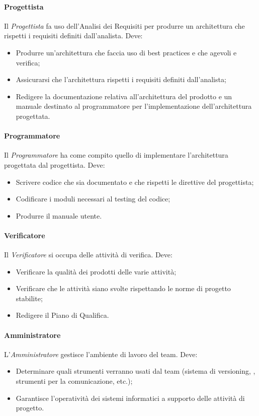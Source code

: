 \paragraph{Progettista} \Spazio
Il \emph{Progettista} fa uso dell'Analisi dei Requisiti per produrre un architettura che rispetti i requisiti definiti dall'analista. Deve:
\begin{itemize}
\item Produrre un'architettura che faccia uso di best practices e che agevoli  e verifica;
\item Assicurarsi che l'architettura rispetti i requisiti definiti dall'analista;
\item Redigere la documentazione relativa all'architettura del prodotto e un manuale destinato al programmatore per l'implementazione dell'architettura progettata.
\end{itemize}

\paragraph{Programmatore} \Spazio
Il \emph{Programmatore} ha come compito quello di implementare l'architettura progettata dal progettista. Deve:
\begin{itemize}
\item Scrivere codice che sia documentato e che rispetti le direttive del progettista;
\item Codificare i moduli necessari al testing del codice;
\item Produrre il manuale utente.
\end{itemize}

\paragraph{Verificatore} \Spazio
Il \emph{Verificatore} si occupa delle attività di verifica. Deve:
\begin{itemize}
\item Verificare la qualità dei prodotti delle varie attività;
\item Verificare che le attività siano svolte rispettando le norme di progetto stabilite;
\item Redigere il Piano di Qualifica.
\end{itemize}

\paragraph{Amministratore} \Spazio
L'\emph{Amministratore} gestisce l'ambiente di lavoro del team. Deve:
\begin{itemize}
\item Determinare quali strumenti verranno usati dal team (sistema di versioning, , strumenti per la comunicazione, etc.);
\item Garantisce l'operatività dei sistemi informatici a supporto delle attività di progetto.
\end{itemize}

